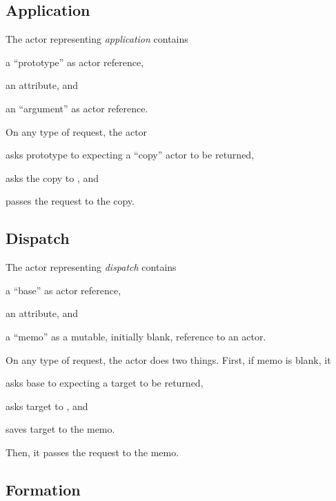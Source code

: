 \subsection{Application}

The actor representing \emph{application} contains
\begin{inparaenum}[1)]
\item a ``prototype'' as actor reference,
\item an attribute,
and
\item an ``argument'' as actor reference.
\end{inparaenum}

On any type of request, the actor
\begin{inparaenum}[1)]
\item asks prototype to  expecting a ``copy'' actor to be returned,
\item asks the copy to ,
and
\item passes the request to the copy.
\end{inparaenum}

\subsection{Dispatch}

The actor representing \emph{dispatch} contains
\begin{inparaenum}[1)]
\item a ``base'' as actor reference,
\item an attribute,
and
\item a ``memo'' as a mutable, initially blank, reference to an actor.
\end{inparaenum}

On any type of request, the actor does two things.
First, if memo is blank, it
\begin{inparaenum}[1)]
\item asks base to  expecting a target to be returned,
\item asks target to ,
and
\item saves target to the memo.
\end{inparaenum}
Then, it passes the request to the memo.

\subsection{Formation}


